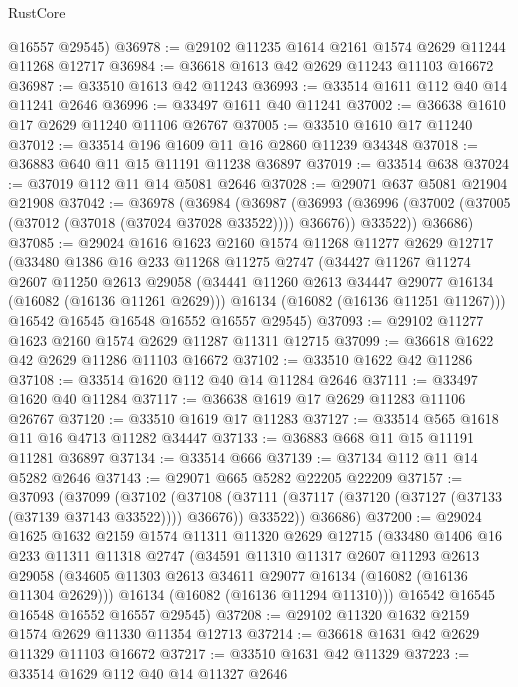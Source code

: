 \begin{lexlean}{RustCore}
\begin{coremodule}
      @16557
      @29545)
@36978 := @29102 @11235 @1614 @2161 @1574 @2629 @11244 @11268 @12717
@36984 := @36618 @1613 @42 @2629 @11243 @11103 @16672
@36987 := @33510 @1613 @42 @11243
@36993 := @33514 @1611 @112 @40 @14 @11241 @2646
@36996 := @33497 @1611 @40 @11241
@37002 := @36638 @1610 @17 @2629 @11240 @11106 @26767
@37005 := @33510 @1610 @17 @11240
@37012 := @33514 @196 @1609 @11 @16 @2860 @11239 @34348
@37018 := @36883 @640 @11 @15 @11191 @11238 @36897
@37019 := @33514 @638
@37024 := @37019 @112 @11 @14 @5081 @2646
@37028 := @29071 @637 @5081 @21904 @21908
@37042 := @36978
    (@36984
      (@36987
        (@36993 (@36996 (@37002 (@37005 (@37012 (@37018 (@37024 @37028 @33522)))) @36676)) @33522))
      @36686)
@37085 := @29024
    @1616
    @1623
    @2160
    @1574
    @11268
    @11277
    @2629
    @12717
    (@33480
      @1386
      @16
      @233
      @11268
      @11275
      @2747
      (@34427
        @11267
        @11274
        @2607
        @11250
        @2613
        @29058
        (@34441 @11260 @2613 @34447 @29077 @16134 (@16082 (@16136 @11261 @2629)))
        @16134
        (@16082 (@16136 @11251 @11267)))
      @16542
      @16545
      @16548
      @16552
      @16557
      @29545)
@37093 := @29102 @11277 @1623 @2160 @1574 @2629 @11287 @11311 @12715
@37099 := @36618 @1622 @42 @2629 @11286 @11103 @16672
@37102 := @33510 @1622 @42 @11286
@37108 := @33514 @1620 @112 @40 @14 @11284 @2646
@37111 := @33497 @1620 @40 @11284
@37117 := @36638 @1619 @17 @2629 @11283 @11106 @26767
@37120 := @33510 @1619 @17 @11283
@37127 := @33514 @565 @1618 @11 @16 @4713 @11282 @34447
@37133 := @36883 @668 @11 @15 @11191 @11281 @36897
@37134 := @33514 @666
@37139 := @37134 @112 @11 @14 @5282 @2646
@37143 := @29071 @665 @5282 @22205 @22209
@37157 := @37093
    (@37099
      (@37102
        (@37108 (@37111 (@37117 (@37120 (@37127 (@37133 (@37139 @37143 @33522)))) @36676)) @33522))
      @36686)
@37200 := @29024
    @1625
    @1632
    @2159
    @1574
    @11311
    @11320
    @2629
    @12715
    (@33480
      @1406
      @16
      @233
      @11311
      @11318
      @2747
      (@34591
        @11310
        @11317
        @2607
        @11293
        @2613
        @29058
        (@34605 @11303 @2613 @34611 @29077 @16134 (@16082 (@16136 @11304 @2629)))
        @16134
        (@16082 (@16136 @11294 @11310)))
      @16542
      @16545
      @16548
      @16552
      @16557
      @29545)
@37208 := @29102 @11320 @1632 @2159 @1574 @2629 @11330 @11354 @12713
@37214 := @36618 @1631 @42 @2629 @11329 @11103 @16672
@37217 := @33510 @1631 @42 @11329
@37223 := @33514 @1629 @112 @40 @14 @11327 @2646

\end{coremodule}
\end{lexlean}
